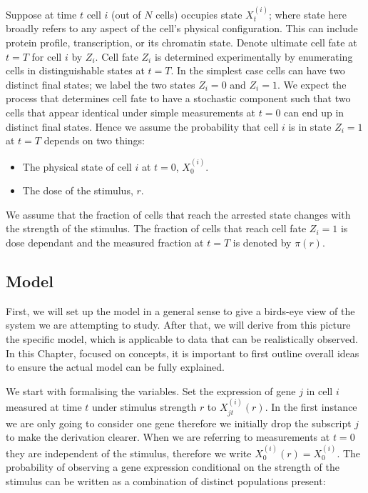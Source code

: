 
Suppose at time $t$ cell $i$ (out of $N$ cells) occupies state $X_{t}^{(i)}$; where state here broadly refers to any aspect of the cell's physical configuration. This can include protein profile, transcription, or its chromatin state. Denote ultimate cell fate at $t=T$ for cell $i$ by $Z_i$. Cell fate $Z_i$ is determined experimentally by enumerating cells in distinguishable states at $t=T$. In the simplest case cells can have two distinct final states; we label the two states $Z_i = 0$ and $Z_i = 1$. We expect the process that determines cell fate to have a stochastic component such that two cells that appear identical under simple measurements at $t=0$ can end up in distinct final states. Hence we assume the probability that cell $i$ is in state $Z_i = 1$ at $t=T$ depends on two things:

\begin{itemize}
\item The physical state of cell $i$ at $t=0$, $X_{0}^{(i)} $.
\item The dose of the stimulus, $r$.
\end{itemize}

We assume that the fraction of cells that reach the arrested state changes with the strength of the stimulus. The fraction of cells that reach cell fate $Z_i = 1$ is dose dependant and the measured fraction at $t=T$ is denoted by $\pi(r)$.

\subsection{Model}
\label{sec:model-cell}

First, we will set up the model in a general sense to give a birds-eye view of the system we are attempting to study. After that, we will derive from this picture the specific model, which is applicable to data that can be realistically observed. In this Chapter, focused on concepts, it is important to first outline overall ideas to ensure the actual model can be fully explained.

We start with formalising the variables. Set the expression of gene $j$ in cell $i$ measured at time $t $ under stimulus strength $r$ to $X_{jt}^{(i)}(r)$. In the first instance we are only going to consider one gene therefore we initially drop the subscript $j$ to make the derivation clearer. When we are referring to measurements at $t=0$ they are independent of the stimulus, therefore we write $X_0^{(i)}(r) = X_0^{(i)}$. The probability of observing a gene expression conditional on the strength of the stimulus can be written as a combination of distinct populations present:

